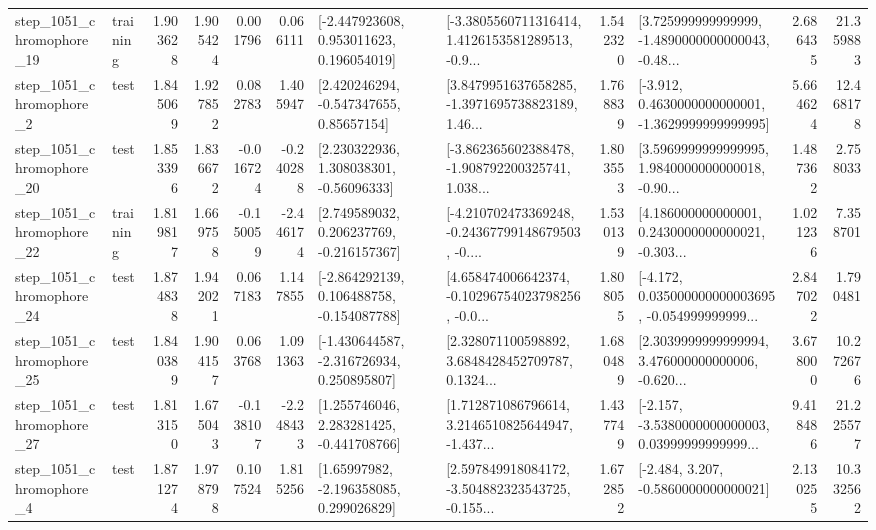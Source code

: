 \begin{tabular}{llrrrrllrlrr}
 step\_1051\_chromophore\_19 &  training &      1.903628 &    1.905424 &      0.001796 &  0.066111 &    [-2.447923608, 0.953011623, 0.196054019] &  [-3.3805560711316414, 1.4126153581289513, -0.9... &       1.542320 &  [3.725999999999999, -1.4890000000000043, -0.48... &            2.686435 &         21.359883 \\
  step\_1051\_chromophore\_2 &      test &      1.845069 &    1.927852 &      0.082783 &  1.405947 &     [2.420246294, -0.547347655, 0.85657154] &  [3.8479951637658285, -1.3971695738823189, 1.46... &       1.768839 &  [-3.912, 0.4630000000000001, -1.3629999999999995] &            5.664624 &         12.468178 \\
 step\_1051\_chromophore\_20 &      test &      1.853396 &    1.836672 &     -0.016724 & -0.240288 &     [2.230322936, 1.308038301, -0.56096333] &  [-3.862365602388478, -1.908792200325741, 1.038... &       1.803553 &  [3.5969999999999995, 1.9840000000000018, -0.90... &            1.487362 &          2.758033 \\
 step\_1051\_chromophore\_22 &  training &      1.819817 &    1.669758 &     -0.150059 & -2.446174 &    [2.749589032, 0.206237769, -0.216157367] &  [-4.210702473369248, -0.24367799148679503, -0.... &       1.530139 &  [4.186000000000001, 0.2430000000000021, -0.303... &            1.021236 &          7.358701 \\
 step\_1051\_chromophore\_24 &      test &      1.874838 &    1.942021 &      0.067183 &  1.147855 &   [-2.864292139, 0.106488758, -0.154087788] &  [4.658474006642374, -0.10296754023798256, -0.0... &       1.808055 &  [-4.172, 0.035000000000003695, -0.054999999999... &            2.847022 &          1.790481 \\
 step\_1051\_chromophore\_25 &      test &      1.840389 &    1.904157 &      0.063768 &  1.091363 &   [-1.430644587, -2.316726934, 0.250895807] &  [2.328071100598892, 3.6848428452709787, 0.1324... &       1.680489 &  [2.3039999999999994, 3.476000000000006, -0.620... &            3.678000 &         10.272676 \\
 step\_1051\_chromophore\_27 &      test &      1.813150 &    1.675043 &     -0.138107 & -2.248433 &    [1.255746046, 2.283281425, -0.441708766] &  [1.712871086796614, 3.2146510825644947, -1.437... &       1.437749 &  [-2.157, -3.5380000000000003, 0.03999999999999... &            9.418486 &         21.225577 \\
  step\_1051\_chromophore\_4 &      test &      1.871274 &    1.978798 &      0.107524 &  1.815256 &     [1.65997982, -2.196358085, 0.299026829] &  [2.597849918084172, -3.504882323543725, -0.155... &       1.672852 &               [-2.484, 3.207, -0.5860000000000021] &            2.130255 &         10.332562 \\

\end{tabular}

